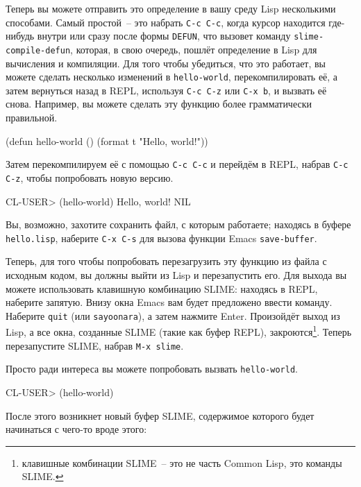 Теперь вы можете отправить это определение в вашу среду Lisp несколькими способами. Самый
простой~-- это набрать \texttt{C-c C-c}, когда курсор находится где-нибудь внутри или сразу после
формы \lstinline{DEFUN}, что вызовет команду \texttt{slime-compile-defun}, которая, в свою очередь, пошлёт
определение в Lisp для вычисления и компиляции. Для того чтобы убедиться, что это
работает, вы можете сделать несколько изменений в \lstinline{hello-world}, перекомпилировать её, а
затем вернуться назад в REPL, используя \texttt{C-c C-z} или \texttt{C-x b}, и вызвать её снова. Например,
вы можете сделать эту функцию более грамматически правильной.

\begin{myverb}
(defun hello-world ()
  (format t "Hello, world!"))
\end{myverb}

Затем перекомпилируем её с помощью \texttt{C-c C-c} и перейдём в REPL, набрав \texttt{C-c C-z}, чтобы
попробовать новую версию.

\begin{myverb}
CL-USER> (hello-world)
Hello, world!
NIL
\end{myverb}

Вы, возможно, захотите сохранить файл, с которым работаете; находясь в буфере
\texttt{hello.lisp}, наберите \texttt{C-x C-s} для вызова функции Emacs \texttt{save-buffer}.

Теперь, для того чтобы попробовать перезагрузить эту функцию из файла с исходным кодом,
вы должны выйти из Lisp и перезапустить его. Для выхода вы можете использовать клавишную
комбинацию SLIME: находясь в REPL, наберите запятую. Внизу окна Emacs вам будет предложено
ввести команду. Наберите \texttt{quit} (или \texttt{sayoonara}), а затем нажмите Enter. Произойдёт выход из
Lisp, а все окна, созданные SLIME (такие как буфер REPL), закроются\footnote{клавишные
  комбинации SLIME~-- это не часть Common Lisp, это команды SLIME.}. Теперь перезапустите
SLIME, набрав \texttt{M-x slime}.

Просто ради интереса вы можете попробовать вызвать \lstinline{hello-world}.

\begin{myverb}
CL-USER> (hello-world)
\end{myverb}

После этого возникнет новый буфер SLIME, содержимое которого будет начинаться с чего-то
вроде этого:

